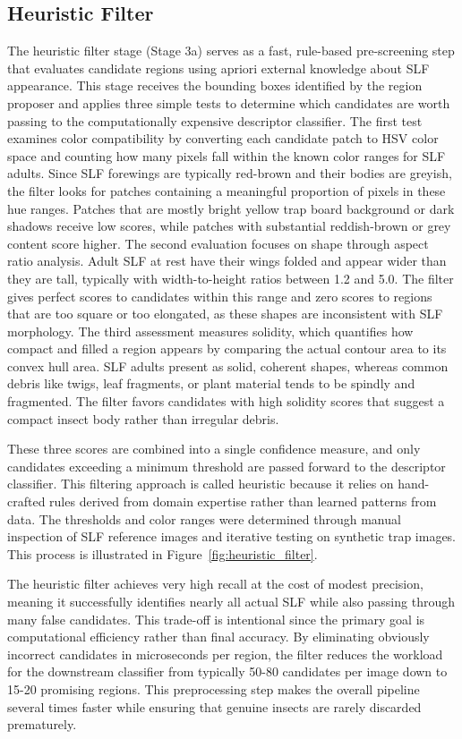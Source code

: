 \documentclass[11pt, a4paper]{article}
\begin{document}
\subsection{Heuristic Filter}
The heuristic filter stage (Stage 3a) serves as a fast, rule-based pre-screening step that evaluates candidate regions using 
apriori external knowledge about SLF appearance. This stage receives the bounding boxes identified by the region proposer and 
applies three simple tests to determine which candidates are worth passing to the computationally expensive descriptor classifier.
The first test examines color compatibility by converting each candidate patch to HSV color space and counting how many pixels fall 
within the known color ranges for SLF adults. Since SLF forewings are typically red-brown and their bodies are greyish, the filter 
looks for patches containing a meaningful proportion of pixels in these hue ranges. Patches that are mostly bright yellow trap board 
background or dark shadows receive low scores, while patches with substantial reddish-brown or grey content score higher.
The second evaluation focuses on shape through aspect ratio analysis. Adult SLF at rest have their wings folded and appear wider than 
they are tall, typically with width-to-height ratios between 1.2 and 5.0. The filter gives perfect scores to candidates within this range 
and zero scores to regions that are too square or too elongated, as these shapes are inconsistent with SLF morphology.
The third assessment measures solidity, which quantifies how compact and filled a region appears by comparing the actual contour area to 
its convex hull area. SLF adults present as solid, coherent shapes, whereas common debris like twigs, leaf fragments, or plant material 
tends to be spindly and fragmented. The filter favors candidates with high solidity scores that suggest a compact insect body rather than 
irregular debris.

These three scores are combined into a single confidence measure, and only candidates exceeding a minimum threshold are passed forward to the descriptor classifier. This filtering approach is called heuristic because it relies on hand-crafted rules derived from domain expertise rather than learned patterns from data. The thresholds and color ranges were determined through manual inspection of SLF reference images and iterative testing on synthetic trap images. This process is illustrated
in Figure~\ref{fig:heuristic_filter}.

The heuristic filter achieves very high recall at the cost of modest precision, meaning it successfully identifies nearly all actual 
SLF while also passing through many false candidates. This trade-off is intentional since the primary goal is computational efficiency 
rather than final accuracy. By eliminating obviously incorrect candidates in microseconds per region, the filter reduces the workload for 
the downstream classifier from typically 50-80 candidates per image down to 15-20 promising regions. This preprocessing step makes the overall pipeline several times faster while ensuring that genuine insects are rarely discarded prematurely.
\end{document}
